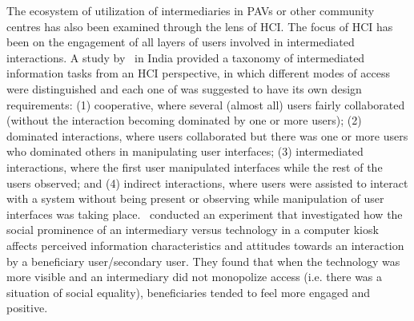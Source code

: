 The ecosystem of utilization of intermediaries in PAVs or other community centres has also been examined through the lens of HCI. The focus of HCI has been on the engagement of all layers of users involved in intermediated interactions. A study by~\cite{parikh2006} in India provided a taxonomy of intermediated information tasks from an HCI perspective, in which different modes of access were distinguished and each one of was suggested to have its own design requirements: (1) cooperative, where several (almost all) users fairly collaborated (without the interaction becoming dominated by one or more users); (2) dominated interactions, where users collaborated but there was one or more users who dominated others in manipulating user interfaces; (3) intermediated interactions, where the first user manipulated interfaces while the rest of the users observed; and (4) indirect interactions, where users were assisted to interact with a system without being present or observing while manipulation of user interfaces was taking place.~\cite{sukumaran2009intermediated} conducted an experiment that investigated how the social prominence of an intermediary versus technology in a computer kiosk affects perceived information characteristics and attitudes towards an interaction by a beneficiary user/secondary user. They found that when the technology was more visible and an intermediary did not monopolize access (i.e. there was a situation of social equality), beneficiaries tended to feel more engaged and positive. 

